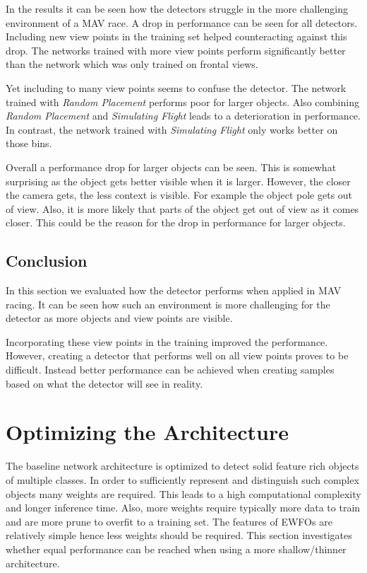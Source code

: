 In the results it can be seen how the detectors struggle in the more challenging environment of a \ac{MAV} race. A drop in performance can be seen for all detectors. Including new view points in the training set helped counteracting against this drop. The networks trained with more view points perform significantly better than the network which was only trained on frontal views.

Yet including to many view points seems to confuse the detector. The network trained with \textit{Random Placement} performs poor for larger objects. Also combining \textit{Random Placement} and \textit{Simulating Flight} leads to a deterioration in performance. In contrast, the network trained with \textit{Simulating Flight} only works better on those bins. 

Overall a performance drop for larger objects can be seen. This is somewhat surprising as the object gets better visible when it is larger. However, the closer the camera gets, the less context is visible. For example the object pole gets out of view. Also, it is more likely that parts of the object get out of view as it comes closer. This could be the reason for the drop in performance for larger objects.

\subsection{Conclusion}

In this section we evaluated how the detector performs when applied in \ac{MAV} racing. It can be seen how such an environment is more challenging for the detector as more objects and view points are visible. 

Incorporating these view points in the training improved the performance. However, creating a detector that performs well on all view points proves to be difficult. Instead better performance can be achieved when creating samples based on what the detector will see in reality.

\section{Optimizing the Architecture}

The baseline network architecture is optimized to detect solid feature rich objects of multiple classes. In order to sufficiently represent and distinguish such complex objects many weights are required. This leads to a high computational complexity and longer inference time. Also, more weights require typically more data to train and are more prune to overfit to a training set. The features of \acp{EWFO} are relatively simple hence less weights should be required. This section investigates whether equal performance can be reached when using a more shallow/thinner architecture.

